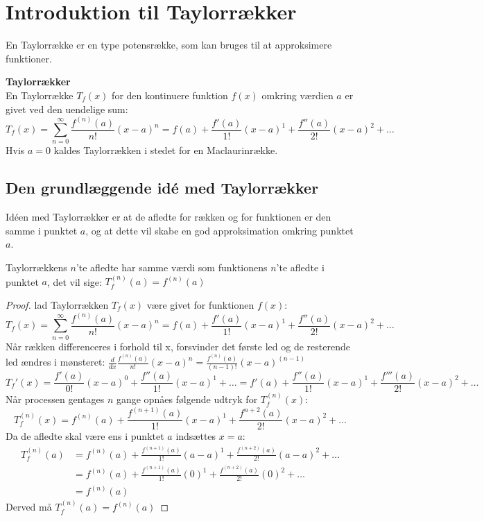 \chapter{Introduktion til Taylorrækker}
\label{ch:tr}
En Taylorrække er en type potensrække, som kan bruges til at approksimere funktioner.
\begin{defn}
    \textbf{Taylorrækker}\\
    En Taylorrække $T_f(x)$ for den kontinuere funktion $f(x)$ omkring værdien $a$ er givet ved den uendelige sum:
    \[
        T_f(x) = \sum^{\infty}_{n=0} \frac{f^{(n)}(a)}{n!} (x-a)^{n}
        = f(a) + \frac{f'(a)}{1!}(x-a)^{1} + \frac{f''(a)}{2!}(x-a)^{2} + \ldots
    \]
    Hvis $a = 0$ kaldes Taylorrækken i stedet for en Maclaurinrække.
\end{defn}
\section{Den grundlæggende idé med Taylorrækker}
\label{def:taylorrække} Idéen med Taylorrækker er at de afledte for rækken og for funktionen er den samme i punktet $a$, 
og at dette vil skabe en god approksimation omkring punktet $a$. 
\begin{thm}
    Taylorrækkens $n$'te afledte har samme værdi som funktionens $n$'te afledte i punktet $a$, 
    det vil sige: $T_f^{(n)}(a) = f^{(n)} (a)$
\end{thm}
\begin{proof}
    lad Taylorrækken $T_f(x)$ være givet for funktionen $f(x)$: 
    \[
        T_f(x) = \sum^{\infty}_{n=0} \frac{f^{(n)}(a)}{n!} (x-a)^{n}
        = f(a) + \frac{f'(a)}{1!}(x-a)^{1} + \frac{f''(a)}{2!}(x-a)^{2} + \ldots
    \]
    Når rækken differenceres i forhold til x, forsvinder det første led og de resterende led ændres i mønsteret: $\frac{d}{dx} \frac{f^{(n)}(a)}{n!} (x-a)^{n} = \frac{f^{(n)}(a)}{(n-1)!} (x-a)^{(n - 1)}$ %
    \[
        T_f'(x) = \frac{f'(a)}{0!}(x-a)^0 + \frac{f''(a)}{1!}(x-a)^{1} + \ldots = f'(a) + \frac{f''(a)}{1!}(x-a)^{1} + \frac{f'''(a)}{2!}(x-a)^{2} + \ldots
    \]
    Når processen gentages $n$ gange opnåes følgende udtryk for $T_f^{(n)}(x)$:
    \[
        T_f^{(n)}(x) = f^{(n)}(a) + \frac{f^{(n + 1)}(a)}{1!}(x-a)^{1} + \frac{f^{n + 2}(a)}{2!}(x-a)^{2} + \ldots
    \]
    Da de afledte skal være ens i punktet $a$ indsættes $x = a$:
    \begin{align*}
        T_f^{(n)}(a) &= f^{(n)}(a) + \frac{f^{(n + 1)}(a)}{1!}(a-a)^{1} + \frac{f^{(n + 2)}(a)}{2!}(a-a)^{2} + \ldots \\
                   &= f^{(n)}(a) + \frac{f^{(n + 1)}(a)}{1!}(0)^{1} + \frac{f^{(n + 2)}(a)}{2!}(0)^{2} + \ldots \\
                   &= f^{(n)}(a)        
    \end{align*}
    Derved må $T_f^{(n)}(a) = f^{(n)}(a)$
\end{proof}
